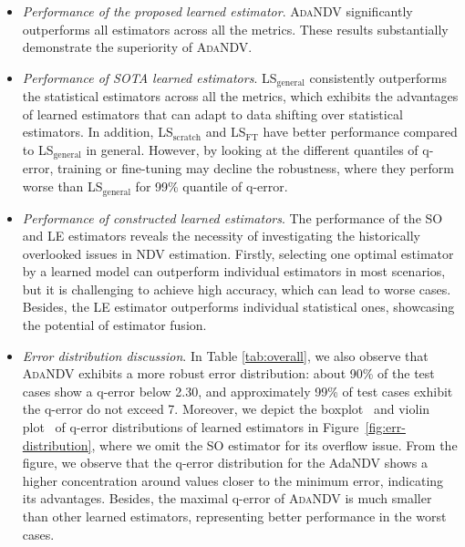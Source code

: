 \begin{itemize}[leftmargin=10pt]
\item \textit{Performance of the proposed learned estimator}.
\textsc{AdaNDV} significantly outperforms all estimators across all the metrics. These results substantially demonstrate the superiority of \textsc{AdaNDV}.


\item \textit{Performance of SOTA learned estimators}. 
LS$_{\mathrm{general}}$ consistently outperforms the statistical estimators across all the metrics, which exhibits the advantages of learned estimators that can adapt to data shifting over statistical estimators.
In addition, LS$_{\mathrm{scratch}}$ and LS$_{\mathrm{FT}}$ have better performance compared to LS$_{\mathrm{general}}$ in general.
However, by looking at the different quantiles of q-error, training or fine-tuning may decline the robustness, where they perform worse than LS$_{\mathrm{general}}$ for 99\% quantile of q-error.


\item \textit{Performance of constructed learned estimators}. The performance of the SO and LE estimators reveals the necessity of investigating the historically overlooked issues in NDV estimation. Firstly, selecting one optimal estimator by a learned model can outperform individual estimators in most scenarios, but it is challenging to achieve high accuracy, which can lead to worse cases. Besides, the LE estimator outperforms individual statistical ones, showcasing the potential of estimator fusion.

\item \textit{Error distribution discussion}. 
In Table \ref{tab:overall}, we also observe that \textsc{AdaNDV} exhibits a more robust error distribution: about 90\% of the test cases show a q-error below 2.30, and approximately 99\% of test cases exhibit the q-error do not exceed 7. 
Moreover, we depict the boxplot~\cite{boxplot} and violin plot~\cite{violinplot} of q-error distributions of learned estimators in Figure~\ref{fig:err-distribution}, where we omit the SO estimator for its overflow issue. 
From the figure, we observe that the q-error distribution for the AdaNDV shows a higher concentration around values closer to the minimum error, indicating its advantages. Besides, the maximal q-error of \textsc{AdaNDV} is much smaller than other learned estimators, representing better performance in the worst cases.

\end{itemize}



